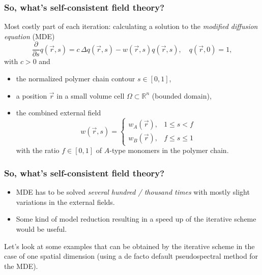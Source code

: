 \begin{frame}[t]
    \frametitle{So, what's self-consistent field theory?}

    Most costly part of each iteration:
    calculating a solution to the \emph{modified diffusion equation} (MDE)
        \begin{equation}
            \frac{\partial}{\partial s}q(\vec{r}, s) = c\,\Delta q(\vec{r}, s) - w(\vec{r}, s)q(\vec{r}, s), \quad q(\vec{r}, 0) = 1,
        \end{equation}
    with $c > 0$ and
    \begin{itemize}
        \item the normalized polymer chain contour $s \in [0, 1]$,
        \item a position $\vec{r}$ in a small volume cell $\Omega \subset \mathbb{R}^{n}$ (bounded domain),
        \item {} the combined external field
        \begin{equation}
            w(\vec{r}, s) = \begin{cases}
                w_{A}(\vec{r}), & 1 \leq s < f \\
                w_{B}(\vec{r}), & f \leq s \leq 1
            \end{cases}
        \end{equation}
        with the ratio $f \in [0, 1]$ of $A$-type monomers in the polymer chain.
    \end{itemize}
\end{frame}

\begin{frame}[t]
    \frametitle{So, what's self-consistent field theory?}

    \vfill

    \begin{itemize}
        \item MDE has to be solved \emph{several hundred / thousand times} with mostly slight variations in the external fields.
        \item Some kind of model reduction resulting in a speed up of the iterative scheme would be useful.
    \end{itemize}

    \vfill
    Let's look at some examples that can be obtained by the iterative scheme in the case of one spatial dimension
    (using a de facto default pseudospectral method for the MDE).
    \vfill
\end{frame}

